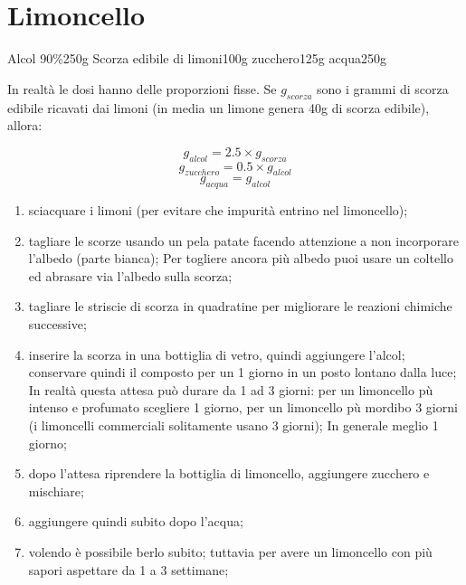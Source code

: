 \section{Limoncello}

\generalRecipeInfos{}

\ingredienti%
    {Alcol 90\%}{250g}%
    {Scorza edibile di limoni}{100g}%
    {zucchero}{125g}%
    {acqua}{250g}%


In realtà le dosi hanno delle proporzioni fisse\cite{bressanini-2018a}. Se $g_{scorza}$ sono i grammi di scorza edibile ricavati dai limoni (in media un limone genera 40g di scorza edibile), allora:

$$g_{alcol} = 2.5 \times g_{scorza}$$
$$g_{zucchero} = 0.5 \times g_{alcol}$$
$$g_{acqua} = g_{alcol}$$

\begin{enumerate}
	\item sciacquare i limoni (per evitare che impurità entrino nel limoncello);
	\item tagliare le scorze usando un pela patate facendo attenzione a non incorporare l'albedo (parte bianca); Per togliere ancora più albedo puoi usare un coltello ed abrasare via l'albedo sulla scorza;
	\item tagliare le striscie di scorza in quadratine per migliorare le reazioni chimiche successive;
	\item inserire la scorza in una bottiglia di vetro, quindi aggiungere l'alcol; conservare quindi il composto per un 1 giorno in un posto lontano dalla luce; In realtà
		questa attesa può durare da 1 ad 3 giorni: per un limoncello pù intenso e profumato scegliere 1 giorno, per un limoncello pù mordibo 3 giorni (i limoncelli commerciali solitamente usano 3 giorni);
		In generale meglio 1 giorno;
	\item dopo l'attesa riprendere la bottiglia di limoncello, aggiungere zucchero e mischiare;
	\item aggiungere quindi subito dopo l'acqua;

	\item volendo è possibile berlo subito; tuttavia per avere un limoncello con più sapori aspettare da 1 a 3 settimane;
\end{enumerate}

